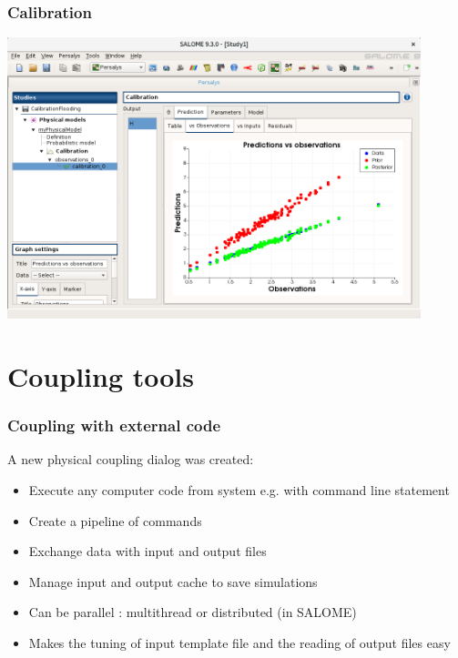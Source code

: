 \documentclass{beamer}
\begin{document}

\begin{frame}
\frametitle{Calibration}
	
\begin{center}
\includegraphics[width=0.9\textwidth]{figures/calibration-Resultat-3DVAR.png}
\end{center}

\end{frame}


\section{Coupling tools}

\begin{frame}
\frametitle{Coupling with external code}

A new physical coupling dialog was created:
\begin{itemize}
\item Execute any computer code from system e.g. with command line statement
\item Create a pipeline of commands
\item Exchange data with input and output files
\item Manage input and output cache to save simulations
\item Can be parallel : multithread or distributed (in SALOME)
\item Makes the tuning of input template file and the reading of output files easy
\end{itemize}

\end{frame}
\end{document}
